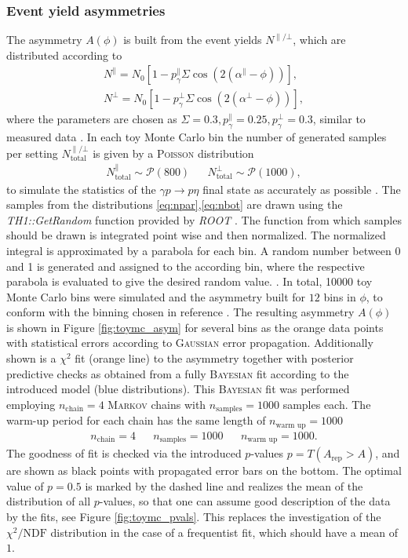 \subsubsection{Event yield asymmetries}
The asymmetry $A\left(\phi\right)$ is built from the event yields $N^{\parallel/\bot}$, which are distributed according to
\begin{align}
	N^{\parallel}=N_0\left[1-p_\gamma^\parallel\Sigma\cos\left(2\left(\alpha^\parallel-\phi\right)\right)\right],\label{eq:npar}\\
	N^{\bot}=N_0\left[1-p_\gamma^\bot\Sigma\cos\left(2\left(\alpha^\bot-\phi\right)\right)\right],
	\label{eq:nbot}
\end{align}
where the parameters are chosen as $\Sigma=0.3,p_\gamma^\parallel=0.25,p_\gamma^\bot=0.3$, similar to measured data \cite{farahphd}. In each toy Monte Carlo bin the number of generated samples per setting $N_\text{total}^{\parallel/\bot}$ is given by a \textsc{Poisson} distribution
\begin{align}
N_\text{total}^\parallel \sim \mathcal{P}(800) && N_\text{total}^\bot \sim \mathcal{P}(1000),
\end{align}
to simulate the statistics of the $\gamma p \to p\eta$ final state as accurately as possible \cite{farahphd}. The samples from the distributions \eqref{eq:npar},\eqref{eq:nbot} are drawn using the \emph{TH1::GetRandom} \cite{rrandom} function provided by \emph{ROOT} \cite{root}. The function from which samples should be drawn is integrated point wise and then normalized. The normalized integral is approximated by a parabola for each bin. A random number between 0 and 1 is generated and assigned to the according bin, where the respective parabola is evaluated to give the desired random value. \cite{rrandom}.
\noindent In total, 10000 toy Monte Carlo bins were simulated and the asymmetry built for $12$ bins in $\phi$, to conform with the binning chosen in reference \cite{farahphd}. The resulting asymmetry $A\left(\phi\right)$ is shown in Figure \ref{fig:toymc_asym} for several bins as the orange data points with statistical errors according to \textsc{Gaussian} error propagation. Additionally shown is a $\chi^2$ fit (orange line) to the asymmetry together with posterior predictive checks as obtained from a fully \textsc{Bayesian} fit according to the introduced model (blue distributions). This \textsc{Bayesian} fit was performed employing $n_\text{chain}=4$ \textsc{Markov} chains with $n_\text{samples}=1000$ samples each. The warm-up period for each chain has the same length of $n_\text{warm up}=1000$
\begin{align}
	n_\text{chain}=4 && n_\text{samples}=1000 && n_\text{warm up}=1000.
\end{align}
The goodness of fit is checked via the introduced $p$-values $p=T(A_\text{rep}>A)$, and are shown as black points with propagated error bars on the bottom. The optimal value of $p=0.5$ is marked by the dashed line and realizes the mean of the distribution of all $p$-values, so that one can assume good description of the data by the fits, see Figure \ref{fig:toymc_pvals}. This replaces the investigation of the $\chi^2/\text{NDF}$ distribution in the case of a frequentist fit, which should have a mean of $1$.  

